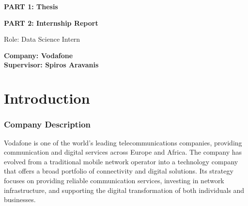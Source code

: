\documentclass[12pt, a4paper, oneside]{report}
\begin{document}
\begin{titlepage}
    \begin{center}
        \vspace*{1cm}
        
        \Huge
        \textbf{PART 1: Thesis} \\
        \vspace{1cm}

    \end{center}
\end{titlepage}

\begin{titlepage}
    \begin{center}
        \vspace*{1cm}
        
        \Huge
        \textbf{PART 2: Internship Report} \\
        \vspace{1cm}
        
        \Large
        Role: Data Science Intern \\
        \vspace{2cm}
        
        \huge
        \textbf{Company: Vodafone} \\
        \vspace{0.5cm}
        \textbf{Supervisor: Spiros Aravanis}

    \end{center}
\end{titlepage}


\tableofcontents
\newpage



\chapter{Introduction}
	
\subsection{Company Description}
Vodafone is one of the world's leading telecommunications companies, providing communication and digital services across Europe and Africa. The company has evolved from a traditional mobile network operator into a technology company that offers a broad portfolio of connectivity and digital solutions. Its strategy focuses on providing reliable communication services, investing in network infrastructure, and supporting the digital transformation of both individuals and businesses.
\end{document}
